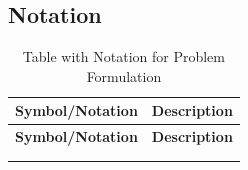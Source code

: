 
\subsection{Notation}
\begin{longtable}{|c|p{10cm}|}
\hline
\textbf{Symbol/Notation} & \textbf{Description} \\ \hline
\endfirsthead

\hline
\textbf{Symbol/Notation} & \textbf{Description} \\ \hline
\endhead

\hline
\endfoot

\hline
\caption{Table with Notation for Problem Formulation} \\
\endlastfoot


\end{longtable}
